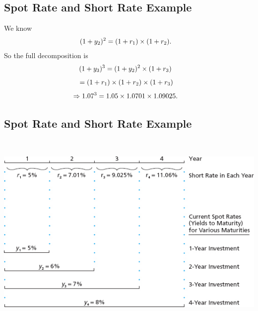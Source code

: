 \documentclass[letterpaper,10pt,english]{sphinxmanual}
\begin{document}
\subsection{Spot Rate and Short Rate Example}
\label{termStructure:id5}
We know
\begin{gather}
\begin{split}(1+y_2)^2 & = (1+r_1) \times (1+r_2).\end{split}\notag
\end{gather}
So the full decomposition is
\begin{gather}
\begin{split}(1+y_3)^3 & = (1+y_2)^2 \times (1+r_3)\end{split}\notag
\end{gather}\begin{gather}
\begin{split}& = (1+r_1) \times (1+r_2) \times (1+r_3)\end{split}\notag
\end{gather}\begin{gather}
\begin{split}\Rightarrow 1.07^3 & = 1.05 \times 1.0701 \times 1.09025.\end{split}\notag
\end{gather}

\subsection{Spot Rate and Short Rate Example}
\label{termStructure:id6}
$\qquad$

\includegraphics[width=6in]{pg486_3.jpg}
\end{document}
